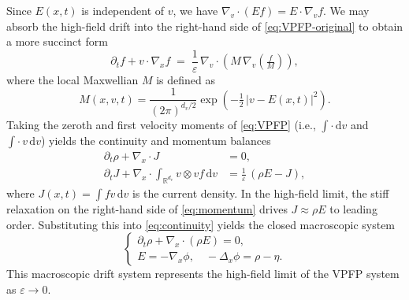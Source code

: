 \documentclass[]{article}
\numberwithin{equation}{section}
\newcommand{\dv}{\mathrm{d}v}
\begin{document}
Since \(E(x,t)\) is independent of \(v\), we have \(\nabla_v\cdot(E f)=E\cdot\nabla_v f\). We may absorb the high-field drift into the right-hand side of \eqref{eq:VPFP-original} to obtain a more succinct form
\begin{equation}\label{eq:VPFP}
     \partial_t f + v\cdot\nabla_x f \;=\; \frac{1}{\varepsilon}\,\nabla_v\cdot\left(M\,\nabla_v\left(\tfrac{f}{M}\right)\right),
\end{equation}
where the local Maxwellian \(M\) is defined as
\begin{equation}\label{eq:Maxwellian_def}
   M(x,v,t)=\frac{1}{(2\pi)^{d_v/2}}\exp\left(-\tfrac12\,|v-E(x,t)|^2\right).
\end{equation}
Taking the zeroth and first velocity moments of \eqref{eq:VPFP} (i.e., $\int \cdot\,\dv$ and $\int \cdot\, v\,\dv$) yields the continuity and momentum balances
\begin{align}
  \partial_t \rho + \nabla_x \cdot J &= 0, \label{eq:continuity}\\
  \partial_t J + \nabla_x \cdot \int_{\mathbb{R}^{d_v}}v\otimes v f\,\dv &= \frac{1}{\varepsilon}\,(\rho E - J), \label{eq:momentum}
\end{align}
where \(J(x,t)=\int fv\,\dv\) is the current density. In the high-field limit, the stiff relaxation on the right-hand side of \eqref{eq:momentum} drives \(J \approx \rho E\) to leading order. Substituting this into \eqref{eq:continuity} yields the closed macroscopic system
\begin{equation}\label{eq:macro_drift}
  \begin{cases}
  \partial_t \rho + \nabla_x \cdot (\rho E) = 0, \\[2pt]
  E = -\nabla_x \phi, \quad -\Delta_x \phi = \rho - \eta.
  \end{cases}
\end{equation}
This macroscopic drift system represents the high-field limit of the VPFP system as \(\varepsilon \to 0\).
\end{document}
